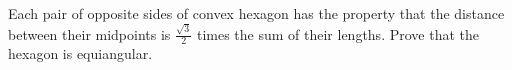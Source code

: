 Each pair of opposite sides of convex hexagon has the property that
the distance between their midpoints is $\frac{\sqrt3}{2}$
times the sum of their lengths.
Prove that the hexagon is equiangular.
